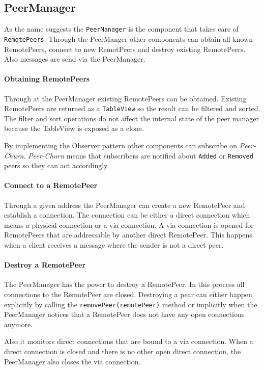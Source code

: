 \subsection{PeerManager}\label{sec:mit-peerManager}
As the name suggests the \lstinline|PeerManager| is the component that takes care of \lstinline|RemotePeers|. Through the PeerManger other components can obtain all known RemotePeers, connect to new RemotPeers and destroy existing RemotePeers. Also messages are send via the PeerManager.

\paragraph{Obtaining RemotePeers} \label{paragraph:obtain-remotepeers}
Through at the PeerManager existing RemotePeers can be obtained. Existing RemotePeers are returned as a \lstinline|TableView| so the result can be filtered and sorted. The filter and sort operations do not affect the internal state of the peer manager because the TableView is exposed as a clone. 

By implementing the Observer pattern other components can subscribe on \textit{Peer-Churn}. \textit{Peer-Churn} means that subscribers are notified about \lstinline|Added| or \lstinline|Removed| peers so they can act accordingly.

\paragraph{Connect to a RemotePeer}
Through a given address the PeerManager can create a new RemotePeer and establish a connection. The connection can be either a direct connection which means a physical connection or a via connection. A via connection is opened for RemotePeers that are addressable by another direct RemotePeer. This happens when a client receives a message where the sender is not a direct peer.

\paragraph{Destroy a RemotePeer}
The PeerManager has the power to destroy a RemotePeer. In this process all connections to the RemotePeer are closed. 
Destroying a pear can either happen explicitly by calling the \lstinline|removePeer(remotePeer)| method or implicitly when the PeerManager notices that a RemotePeer does not have any open connections anymore.

Also it monitors direct connections that are bound to a via connection. When a direct connection is closed and there is no other open direct connection, the PeerManager also closes the via connection.

